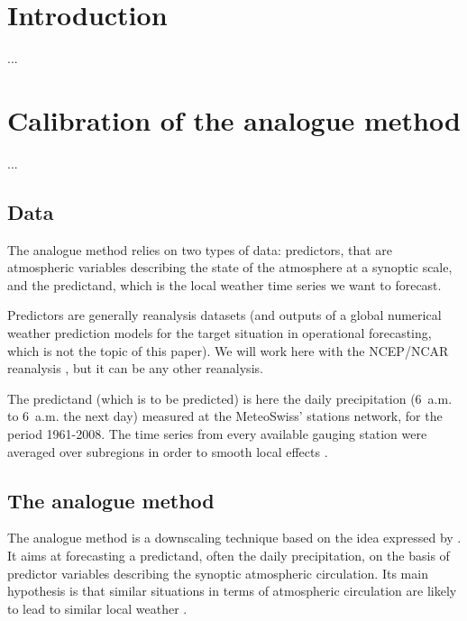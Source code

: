 \documentclass[twocol]{ametsoc}
\begin{document}


\section{Introduction}
...
\cite{Horton2012a}


\section{Calibration of the analogue method}
...

\subsection{Data}
\label{section_data}

The analogue method relies on two types of data: predictors, that are atmospheric variables describing the state of the atmosphere at a synoptic scale, and the predictand, which is the local weather time series we want to forecast.

Predictors are generally reanalysis datasets (and outputs of a global numerical weather prediction models for the target situation in operational forecasting, which is not the topic of this paper). We will work here with the NCEP/NCAR reanalysis \citep[6-hourly, 17 atmospheric levels at a resolution of 2.5\degree, see][]{Kalnay1996}, but it can be any other reanalysis.

The predictand (which is to be predicted) is here the daily precipitation (6~a.m. to 6~a.m. the next day) measured at the MeteoSwiss' stations network, for the period 1961-2008. The time series from every available gauging station were averaged over subregions in order to smooth local effects \citep{Obled2002, Marty2012}.


\subsection{The analogue method}
\label{section_analog_method}

The analogue method is a downscaling technique based on the idea expressed by \citet{Lorenz1969}. It aims at forecasting a predictand, often the daily precipitation, on the basis of predictor variables describing the synoptic atmospheric circulation. Its main hypothesis is that similar situations in terms of atmospheric circulation are likely to lead to similar local weather \citep{Bontron2005}.
\end{document}

